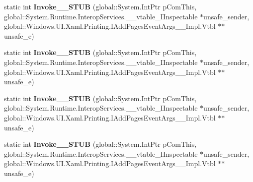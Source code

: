 \begin{DoxyCompactItemize}
\item 
\mbox{\label{struct_windows_1_1_u_i_1_1_xaml_1_1_printing_1_1_add_pages_event_handler_____impl_1_1_vtbl_ad8f7bae7b796ed603b6e0b16206114de}} 
static int {\bfseries Invoke\+\_\+\+\_\+\+S\+T\+UB} (global\+::\+System.\+Int\+Ptr p\+Com\+This, global\+::\+System.\+Runtime.\+Interop\+Services.\+\_\+\+\_\+vtable\+\_\+\+I\+Inspectable $\ast$unsafe\+\_\+sender, global\+::\+Windows.\+U\+I.\+Xaml.\+Printing.\+I\+Add\+Pages\+Event\+Args\+\_\+\+\_\+\+Impl.\+Vtbl $\ast$$\ast$unsafe\+\_\+e)
\item 
\mbox{\label{struct_windows_1_1_u_i_1_1_xaml_1_1_printing_1_1_add_pages_event_handler_____impl_1_1_vtbl_ad8f7bae7b796ed603b6e0b16206114de}} 
static int {\bfseries Invoke\+\_\+\+\_\+\+S\+T\+UB} (global\+::\+System.\+Int\+Ptr p\+Com\+This, global\+::\+System.\+Runtime.\+Interop\+Services.\+\_\+\+\_\+vtable\+\_\+\+I\+Inspectable $\ast$unsafe\+\_\+sender, global\+::\+Windows.\+U\+I.\+Xaml.\+Printing.\+I\+Add\+Pages\+Event\+Args\+\_\+\+\_\+\+Impl.\+Vtbl $\ast$$\ast$unsafe\+\_\+e)
\item 
\mbox{\label{struct_windows_1_1_u_i_1_1_xaml_1_1_printing_1_1_add_pages_event_handler_____impl_1_1_vtbl_ad8f7bae7b796ed603b6e0b16206114de}} 
static int {\bfseries Invoke\+\_\+\+\_\+\+S\+T\+UB} (global\+::\+System.\+Int\+Ptr p\+Com\+This, global\+::\+System.\+Runtime.\+Interop\+Services.\+\_\+\+\_\+vtable\+\_\+\+I\+Inspectable $\ast$unsafe\+\_\+sender, global\+::\+Windows.\+U\+I.\+Xaml.\+Printing.\+I\+Add\+Pages\+Event\+Args\+\_\+\+\_\+\+Impl.\+Vtbl $\ast$$\ast$unsafe\+\_\+e)
\item 
\mbox{\label{struct_windows_1_1_u_i_1_1_xaml_1_1_printing_1_1_add_pages_event_handler_____impl_1_1_vtbl_ad8f7bae7b796ed603b6e0b16206114de}} 
static int {\bfseries Invoke\+\_\+\+\_\+\+S\+T\+UB} (global\+::\+System.\+Int\+Ptr p\+Com\+This, global\+::\+System.\+Runtime.\+Interop\+Services.\+\_\+\+\_\+vtable\+\_\+\+I\+Inspectable $\ast$unsafe\+\_\+sender, global\+::\+Windows.\+U\+I.\+Xaml.\+Printing.\+I\+Add\+Pages\+Event\+Args\+\_\+\+\_\+\+Impl.\+Vtbl $\ast$$\ast$unsafe\+\_\+e)

\end{DoxyCompactItemize}
